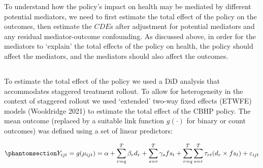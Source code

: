 \documentclass[
  letterpaper,
  DIV=11,
  numbers=noendperiod]{scrartcl}
\providecommand{\DIFaddtex}[1]{{\protect\color{blue}\uwave{#1}}} %
\providecommand{\DIFaddbegin}{} %
\providecommand{\DIFaddend}{} %
\providecommand{\DIFdelbegin}{} %
\providecommand{\DIFdelend}{} %
\providecommand{\DIFadd}[1]{\texorpdfstring{\DIFaddtex{#1}}{#1}} %
\newcommand{\DIFscaledelfig}{0.5}
\newlength{\DIFdelgraphicswidth} %
\newlength{\DIFdelgraphicsheight} %
\newcommand{\DIFaddincludegraphics}[2][]{{\color{blue}\fbox{\DIFOincludegraphics[#1]{#2}}}} %
\newcommand{\DIFdelincludegraphics}[2][]{%
\sbox{\DIFdelgraphicsbox}{\DIFOincludegraphics[#1]{#2}}%
\settoboxwidth{\DIFdelgraphicswidth}{\DIFdelgraphicsbox} %
\settoboxtotalheight{\DIFdelgraphicsheight}{\DIFdelgraphicsbox} %
\scalebox{\DIFscaledelfig}{%
\parbox[b]{\DIFdelgraphicswidth}{\usebox{\DIFdelgraphicsbox}\\[-\baselineskip] \rule{\DIFdelgraphicswidth}{0em}}\llap{\resizebox{\DIFdelgraphicswidth}{\DIFdelgraphicsheight}{%
\setlength{\unitlength}{\DIFdelgraphicswidth}%
\begin{picture}(1,1)%
\thicklines\linethickness{2pt} %
{\color[rgb]{1,0,0}\put(0,0){\framebox(1,1){}}}%
{\color[rgb]{1,0,0}\put(0,0){\line( 1,1){1}}}%
{\color[rgb]{1,0,0}\put(0,1){\line(1,-1){1}}}%
\end{picture}%
}\hspace*{3pt}}} %
} %
\DeclareRobustCommand{\DIFaddbegin}{\DIFOaddbegin \let\includegraphics\DIFaddincludegraphics} %
\DeclareRobustCommand{\DIFaddend}{\DIFOaddend \let\includegraphics\DIFOincludegraphics} %
\DeclareRobustCommand{\DIFdelbegin}{\DIFOdelbegin \let\includegraphics\DIFdelincludegraphics} %
\DeclareRobustCommand{\DIFdelend}{\DIFOaddend \let\includegraphics\DIFOincludegraphics} %
\begin{document}
To understand how the policy's impact on health may be mediated by
different potential mediators, we need to first estimate the total
effect of the policy on the outcomes, then estimate the \(CDE\)s after
adjustment for potential mediators and any residual mediator-outcome
confounding. As discussed above, in order for the mediators to `explain'
the total effects of the policy on health, the policy should affect the
mediators, and the mediators should also affect the outcomes.

\DIFdelbegin %
\DIFdelend \DIFaddbegin \subsection{\DIFadd{Total Effect}}\label{total-effect}
\DIFaddend 

To estimate the total effect of the policy we used a DiD analysis that
accommodates staggered treatment rollout. To allow for heterogeneity in
the context of staggered rollout we used `extended' two-way fixed
effects (ETWFE) models (Wooldridge 2021) to estimate the total effect of
the CBHP policy. The mean outcome (replaced by a suitable link function
\(g(\cdot)\) for binary or count outcomes) was defined using a set of
linear predictors:

\begin{equation}\DIFdelbegin %
\DIFdelend \DIFaddbegin \phantomsection\label{eq-etwfe}{Y_{ijt}=g(\mu_{ijt}) = \alpha + \sum_{r=q}^{T} \beta_{r} d_{r} + \sum_{s=r}^{T} \gamma_{s} fs_{t}+ \sum_{r=q}^{T} \sum_{s=r}^{T} \tau_{rt} (d_{r} \times fs_{t}) + \varepsilon_{ijt}}\DIFaddend \end{equation}
\end{document}

